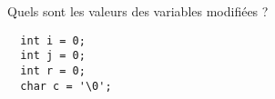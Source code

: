 \documentclass[french,a4paper,addpoints,11pt]{exam}
\begin{document}
\begin{questions}


    \question Quels sont les valeurs des variables modifiées ?

    \begin{lstlisting}
  int i = 0;
  int j = 0;
  int r = 0;
  char c = '\0';
\end{lstlisting}


\end{questions}
\end{document}
